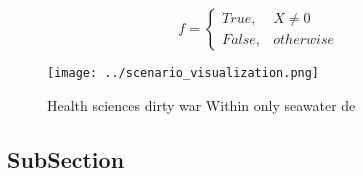 \documentclass[a4paper]{article}
\begin{document}
\begin{equation}   f =
\begin{cases} True, & X \neq 0\\
False, & otherwise
\end{cases}
\end{equation}

\begin{figure}
\centering
\texttt{[image: ../scenario\_visualization.png]}
\caption{Health sciences dirty war Within only seawater de
}
\end{figure}
 
\subsection{SubSection}
\end{document}
